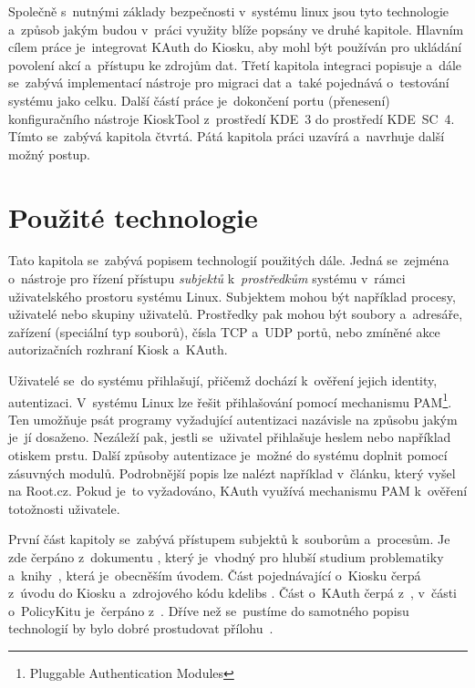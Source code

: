 Společně s~nutnými základy bezpečnosti v~systému linux jsou tyto technologie a~způsob jakým budou v~práci využity blíže popsány ve druhé kapitole. Hlavním cílem práce je~integrovat KAuth do Kiosku, aby mohl být používán pro ukládání povolení akcí a~přístupu ke zdrojům dat. Třetí kapitola integraci popisuje a~dále se~zabývá implementací nástroje pro migraci dat a~také pojednává o~testování systému jako celku. Další částí práce je~dokončení portu (přenesení) konfiguračního nástroje KioskTool z~prostředí KDE~3 do prostředí KDE~SC~4. Tímto se~zabývá kapitola čtvrtá. Pátá kapitola práci uzavírá a~navrhuje další možný postup.

\chapter{Použité technologie}
Tato kapitola se~zabývá popisem technologií použitých dále. Jedná se~zejména o~nástroje pro řízení přístupu \emph{subjektů} k~\emph{prostředkům} systému v~rámci uživatelského prostoru systému Linux. Subjektem mohou být například procesy, uživatelé nebo skupiny uživatelů. Prostředky pak mohou být soubory a~adresáře, zařízení (speciální typ souborů), čísla TCP a~UDP portů, nebo zmíněné akce autorizačních rozhraní Kiosk a~KAuth.

Uživatelé se~do systému přihlašují, přičemž dochází k~ověření jejich identity, autentizaci. V~systému Linux lze řešit přihlašování pomocí mechanismu PAM\footnote{Pluggable Authentication Modules}. Ten umožňuje psát programy vyžadující autentizaci nazávisle na způsobu jakým je~jí dosaženo. Nezáleží pak, jestli se~uživatel přihlašuje heslem nebo například otiskem prstu. Další způsoby autentizace je~možné do systému doplnit pomocí zásuvných modulů. Podrobnější popis lze nalézt například v~článku, který vyšel na Root.cz\cite{rootpam}. Pokud je~to vyžadováno, KAuth využívá mechanismu PAM k~ověření totožnosti uživatele.

První část kapitoly se~zabývá přístupem subjektů k~souborům a~procesům. Je zde čerpáno z~dokumentu \cite{secureProg}, který je~vhodný pro hlubší studium problematiky a~knihy~\cite{OSP}, která je~obecněším úvodem. Část pojednávající o~Kiosku čerpá z~úvodu do Kiosku \cite{Kioskintro} a~zdrojového kódu kdelibs \cite{codeKdeLibs}. Část o~KAuth čerpá z~\cite{codeKAuth,KAuthusage}, v~části o~PolicyKitu je~čerpáno z~\cite{manpolkit_overview, manpolkit1, manpklocalauth}. Dříve než se~pustíme do samotného popisu technologií by bylo dobré prostudovat přílohu~.

